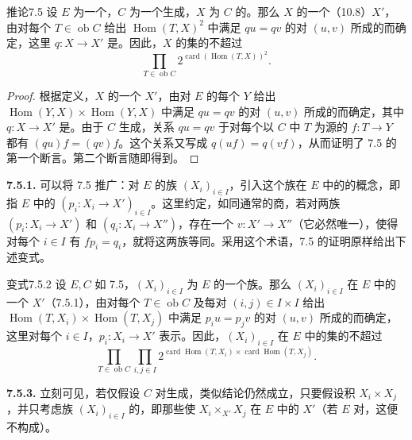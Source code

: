 \begin{SGAresult}{推论}{7.5}
设 $E$ 为一个，$C$ 为一个生成，$X$ 为 $C$ 的。那么 $X$ 的一个（10.8）$X'$，由对每个 $T\in\operatorname{ob}C$ 给出 $\operatorname{Hom}(T,X)^2$ 中满足 $qu=qv$ 的对 $(u,v)$ 所成的而确定，这里 $q:X\to X'$ 是。因此，$X$ 的集的不超过
\[
\prod_{T\in\operatorname{ob}C}2^{\operatorname{card}(\operatorname{Hom}(T,X))^2}.
\]
\end{SGAresult}
\begin{proof}
根据定义，$X$ 的一个 $X'$，由对 $E$ 的每个 $Y$ 给出 $\operatorname{Hom}(Y,X)\times\operatorname{Hom}(Y,X)$ 中满足 $qu=qv$ 的对 $(u,v)$ 所成的而确定，其中 $q:X\to X'$ 是。由于 $C$ 生成，关系 $qu=qv$ 于对每个以 $C$ 中 $T$ 为源的 $f:T\to Y$ 都有 $(qu)f=(qv)f$。这个关系又写成 $q(uf)=q(vf)$，从而证明了 7.5 的第一个断言。第二个断言随即得到。
\end{proof}
\textbf{7.5.1.} 可以将 7.5 推广：对 $E$ 的族 $(X_i)_{i\in I}$，引入这个族在 $E$ 中的的概念，即指 $E$ 中的 $(p_i:X_i\to X')_{i\in I}$。这里约定，如同通常的商，若对两族 $(p_i:X_i\to X')$ 和 $(q_i:X_i\to X'')$，存在一个 $v:X'\to X''$（它必然唯一），使得对每个 $i\in I$ 有 $fp_i=q_i$，就将这两族等同。采用这个术语，7.5 的证明原样给出下述变式。
\begin{SGAresult}{变式}{7.5.2}
设 $E,C$ 如 7.5，$(X_i)_{i\in I}$ 为 $E$ 的一个族。那么 $(X_i)_{i\in I}$ 在 $E$ 中的一个 $X'$（7.5.1），由对每个 $T\in\operatorname{ob}C$ 及每对 $(i,j)\in I\times I$ 给出 $\operatorname{Hom}(T,X_i)\times\operatorname{Hom}(T,X_j)$ 中满足 $p_i u=p_j v$ 的对 $(u,v)$ 所成的而确定，这里对每个 $i\in I$，$p_i:X_i\to X'$ 表示。因此，$(X_i)_{i\in I}$ 在 $E$ 中的集的不超过
\[
\prod_{T\in\operatorname{ob}C}\prod_{i,j\in I}
2^{\operatorname{card}\operatorname{Hom}(T,X_i)\times\operatorname{card}\operatorname{Hom}(T,X_j)}.
\]
\end{SGAresult}
\textbf{7.5.3.} 立刻可见，若仅假设 $C$ 对生成，类似结论仍然成立，只要假设积 $X_i\times X_j$ ，并只考虑族 $(X_i)_{i\in I}$ 的，即那些使 $X_i\times_{X'}X_j$ 在 $E$ 中的 $X'$（若 $E$ 对，这便不构成）。
